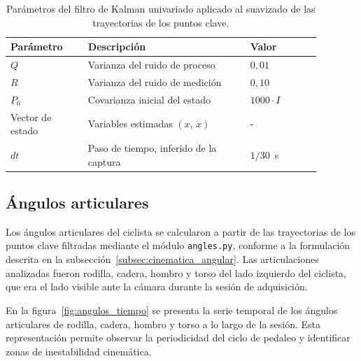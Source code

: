 \begin{table}[H]
      \caption{Parámetros del filtro de Kalman univariado aplicado al suavizado
            de las trayectorias de los puntos clave.}
      \label{tab:params_kalman}
      \centering
      \small
      \begin{tabular}{p{0.22\linewidth}p{0.46\linewidth}p{0.20\linewidth}}
            \toprule
            \textbf{Parámetro} & \textbf{Descripción} & \textbf{Valor} \\
            \midrule
            $Q$      & Varianza del ruido de proceso           & $0{,}01$         \\
            $R$  & Varianza del ruido de medición          & $0{,}10$         \\
            $P_0$                               & Covarianza inicial del estado           & $1000\cdot I$    \\
            Vector de estado                    & Variables estimadas $(x,\,\dot{x})$    & - \\
            $dt$                                & Paso de tiempo, inferido de la captura   & $1/30$~s         \\
            \bottomrule
      \end{tabular}
\end{table}

\subsection{Ángulos articulares}
\label{ssec:angulos}

Los ángulos articulares del ciclista se calcularon a partir de las
trayectorias de los puntos clave filtradas mediante el módulo
\texttt{angles.py}, conforme a la formulación descrita en la
subsección~\ref{subsec:cinematica_angular}. Las articulaciones analizadas
fueron rodilla, cadera, hombro y torso del lado izquierdo del ciclista,
que era el lado visible ante la cámara durante la sesión de adquisición.

En la figura~\ref{fig:angulos_tiempo} se presenta la serie temporal de los
ángulos articulares de rodilla, cadera, hombro y torso a lo largo de la
sesión. Esta representación permite observar la periodicidad del ciclo de
pedaleo y identificar zonas de inestabilidad cinemática.

